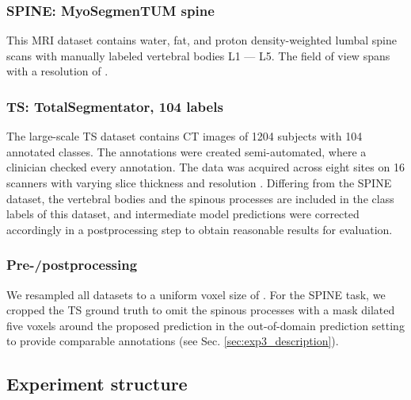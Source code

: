         \subsubsection{SPINE: MyoSegmenTUM spine}
            \label{sec:SPINE_dataset}
            This MRI dataset \citep{burian2019lumbar} contains water, fat, and proton density-weighted lumbal spine scans with manually labeled vertebral bodies L1 --- L5.
            The field of view spans  with a resolution of .

        \subsubsection{TS: TotalSegmentator, 104 labels}
            \label{sec:TS_dataset}
            The large-scale TS dataset contains CT images of 1204 subjects with 104 annotated classes. The annotations were created semi-automated, where a clinician checked every annotation. The data was acquired across eight sites on 16 scanners with varying slice thickness and resolution  \citep{wasserthal2023totalsegmentator}.
            Differing from the SPINE dataset, the vertebral bodies and the spinous processes are included in the class labels of this dataset, and intermediate model predictions were corrected accordingly in a postprocessing step to obtain reasonable results for evaluation.

        \subsubsection{Pre-/postprocessing}
             We resampled all datasets to a uniform voxel size of . For the SPINE task, we cropped the TS ground truth to omit the spinous processes with a mask dilated five voxels around the proposed prediction in the  out-of-domain prediction setting to provide comparable annotations (see Sec. \ref{sec:exp3_description}).

    \subsection{Experiment structure}
